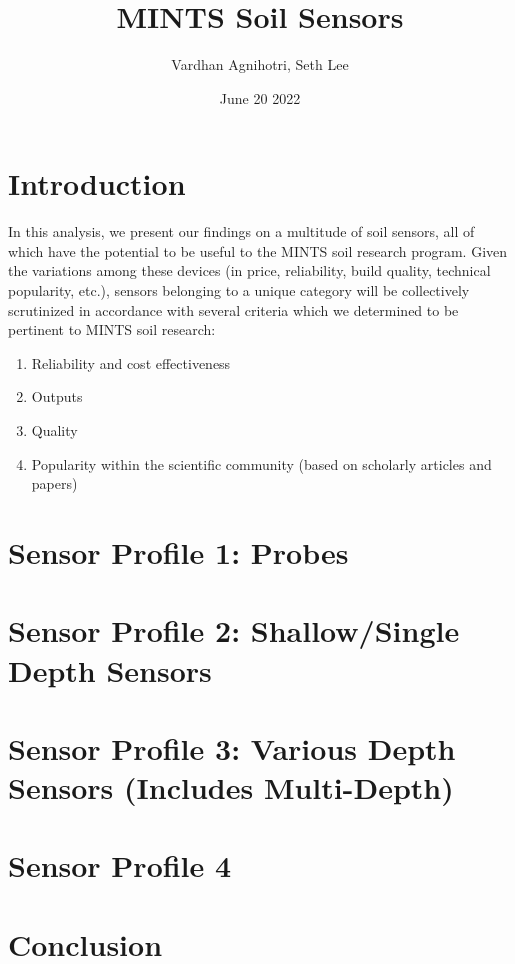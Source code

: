 \documentclass{article}
\title{MINTS Soil Sensors}
\author{Vardhan Agnihotri, Seth Lee}
\date{June 20 2022}
\begin{document}
\maketitle

\section{Introduction}
In this analysis, we present our findings on a multitude of soil sensors, all of which have the potential to be useful to the MINTS soil research program. Given the variations among these devices (in price, reliability, build quality, technical popularity, etc.), sensors belonging to a unique category will be collectively scrutinized in accordance with several criteria which we determined to be pertinent to MINTS soil research:
\begin{enumerate}
    \item Reliability and cost effectiveness
    \item Outputs
    \item Quality %
    \item Popularity within the scientific community (based on scholarly articles and papers)
\end{enumerate}


\section{Sensor Profile 1: Probes}


\section{Sensor Profile 2: Shallow/Single Depth Sensors}

\section{Sensor Profile 3: Various Depth Sensors (Includes Multi-Depth)}

\section{Sensor Profile 4}

\section{Conclusion}
\end{document}
